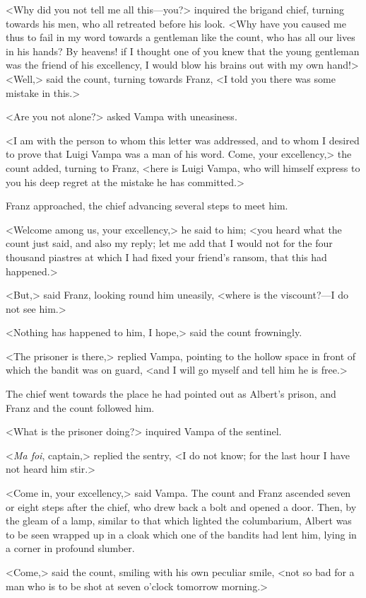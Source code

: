  <Why did you not tell me all this—you?> inquired the brigand chief, turning towards his men, who all retreated before his look. <Why have you caused me thus to fail in my word towards a gentleman like the count, who has all our lives in his hands? By heavens! if I thought one of you knew that the young gentleman was the friend of his excellency, I would blow his brains out with my own hand!>  <Well,> said the count, turning towards Franz, <I told you there was some mistake in this.> 

 <Are you not alone?> asked Vampa with uneasiness. 

 <I am with the person to whom this letter was addressed, and to whom I desired to prove that Luigi Vampa was a man of his word. Come, your excellency,> the count added, turning to Franz, <here is Luigi Vampa, who will himself express to you his deep regret at the mistake he has committed.> 

 Franz approached, the chief advancing several steps to meet him. 

 <Welcome among us, your excellency,> he said to him; <you heard what the count just said, and also my reply; let me add that I would not for the four thousand piastres at which I had fixed your friend's ransom, that this had happened.> 

 <But,> said Franz, looking round him uneasily, <where is the viscount?—I do not see him.> 

 <Nothing has happened to him, I hope,> said the count frowningly. 

 <The prisoner is there,> replied Vampa, pointing to the hollow space in front of which the bandit was on guard, <and I will go myself and tell him he is free.> 

 The chief went towards the place he had pointed out as Albert's prison, and Franz and the count followed him. 

 <What is the prisoner doing?> inquired Vampa of the sentinel. 

 <\textit{Ma foi}, captain,> replied the sentry, <I do not know; for the last hour I have not heard him stir.> 

 <Come in, your excellency,> said Vampa. The count and Franz ascended seven or eight steps after the chief, who drew back a bolt and opened a door. Then, by the gleam of a lamp, similar to that which lighted the columbarium, Albert was to be seen wrapped up in a cloak which one of the bandits had lent him, lying in a corner in profound slumber. 

 <Come,> said the count, smiling with his own peculiar smile, <not so bad for a man who is to be shot at seven o'clock tomorrow morning.> 

